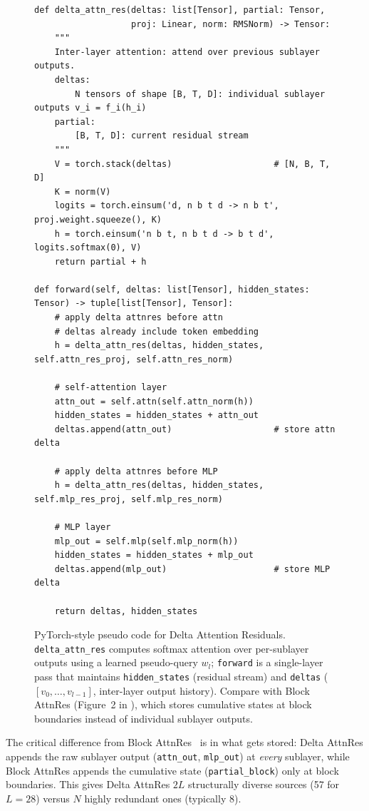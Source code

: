 \documentclass{article}
\begin{document}
\begin{figure}[t]
\begin{lstlisting}[style=python]
def delta_attn_res(deltas: list[Tensor], partial: Tensor,
                   proj: Linear, norm: RMSNorm) -> Tensor:
    """
    Inter-layer attention: attend over previous sublayer outputs.
    deltas:
        N tensors of shape [B, T, D]: individual sublayer outputs v_i = f_i(h_i)
    partial:
        [B, T, D]: current residual stream
    """
    V = torch.stack(deltas)                    # [N, B, T, D]
    K = norm(V)
    logits = torch.einsum('d, n b t d -> n b t', proj.weight.squeeze(), K)
    h = torch.einsum('n b t, n b t d -> b t d', logits.softmax(0), V)
    return partial + h

def forward(self, deltas: list[Tensor], hidden_states: Tensor) -> tuple[list[Tensor], Tensor]:
    # apply delta attnres before attn
    # deltas already include token embedding
    h = delta_attn_res(deltas, hidden_states, self.attn_res_proj, self.attn_res_norm)

    # self-attention layer
    attn_out = self.attn(self.attn_norm(h))
    hidden_states = hidden_states + attn_out
    deltas.append(attn_out)                    # store attn delta

    # apply delta attnres before MLP
    h = delta_attn_res(deltas, hidden_states, self.mlp_res_proj, self.mlp_res_norm)

    # MLP layer
    mlp_out = self.mlp(self.mlp_norm(h))
    hidden_states = hidden_states + mlp_out
    deltas.append(mlp_out)                     # store MLP delta

    return deltas, hidden_states
\end{lstlisting}
\caption{PyTorch-style pseudo code for Delta Attention Residuals. \texttt{delta\_attn\_res} computes softmax attention over per-sublayer outputs using a learned pseudo-query $w_l$; \texttt{forward} is a single-layer pass that maintains \texttt{hidden\_states} (residual stream) and \texttt{deltas} ($[v_0, \ldots, v_{l-1}]$, inter-layer output history). Compare with Block AttnRes (Figure~2 in \citet{kimi2025attention}), which stores cumulative states at block boundaries instead of individual sublayer outputs.}
\label{fig:delta_code}
\end{figure}

The critical difference from Block AttnRes~\citep{kimi2025attention} is in what gets stored: Delta AttnRes appends the raw sublayer output (\texttt{attn\_out}, \texttt{mlp\_out}) at \emph{every} sublayer, while Block AttnRes appends the cumulative state (\texttt{partial\_block}) only at block boundaries. This gives Delta AttnRes $2L$ structurally diverse sources (57 for $L{=}28$) versus $N$ highly redundant ones (typically 8).
\end{document}
